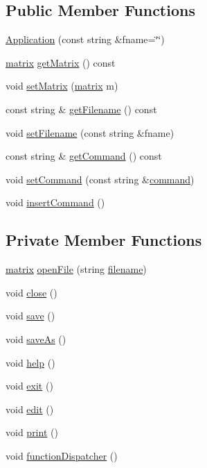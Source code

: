 \subsection*{Public Member Functions}
\begin{DoxyCompactItemize}
\item 
\hyperlink{class_application_ade4650e7378dae1d94794b86995fd571}{Application} (const string \&fname=\char`\"{}\char`\"{})
\item 
\hyperlink{formula_8h_a869e2a5deeb3daa4c82d6bc91cf20d92}{matrix} \hyperlink{class_application_a67aeb617ca44a18045612d92f1d8afa0}{get\+Matrix} () const
\item 
void \hyperlink{class_application_a56b4a55e9eabd40b7f0033ba39631ebe}{set\+Matrix} (\hyperlink{formula_8h_a869e2a5deeb3daa4c82d6bc91cf20d92}{matrix} m)
\item 
const string \& \hyperlink{class_application_a778575fb76de5352152d8928e1c3410f}{get\+Filename} () const
\item 
void \hyperlink{class_application_a76de879568ee39ac80484441716928d2}{set\+Filename} (const string \&fname)
\item 
const string \& \hyperlink{class_application_a74cdbc5e93e1f2c6bb4b45a6ad8b8a62}{get\+Command} () const
\item 
void \hyperlink{class_application_ae652f7ff140c5a74c3806f728e9a18f3}{set\+Command} (const string \&\hyperlink{class_application_acffe56e592fb525ce14ad0437c2c3d34}{command})
\item 
void \hyperlink{class_application_a474d8507e340581404d4044c0228f655}{insert\+Command} ()
\end{DoxyCompactItemize}
\subsection*{Private Member Functions}
\begin{DoxyCompactItemize}
\item 
\hyperlink{formula_8h_a869e2a5deeb3daa4c82d6bc91cf20d92}{matrix} \hyperlink{class_application_ab2f161414a4e2f16e28321c192051006}{open\+File} (string \hyperlink{class_application_a3a20c3178562a91be951369d3356aabd}{filename})
\item 
void \hyperlink{class_application_a5a7dcf61b6701a2b2665c78e4e074e73}{close} ()
\item 
void \hyperlink{class_application_a2cbf94e01d55a814de35f90f4d874647}{save} ()
\item 
void \hyperlink{class_application_a10d5a48c95593cee25c1b9e0e257b5a7}{save\+As} ()
\item 
void \hyperlink{class_application_a2c6518d7f121299d9be8c66d31997fbc}{help} ()
\item 
void \hyperlink{class_application_a3c8a98d6c10a5b054800488df16cdbcb}{exit} ()
\item 
void \hyperlink{class_application_a4b193bf9c8be7105e89a2323ea77b1f4}{edit} ()
\item 
void \hyperlink{class_application_a2bc1937440cb9e71dace95c3fe7ed4ea}{print} ()
\item 
void \hyperlink{class_application_a00241f0a09c32b0ef3cb1f068475cc50}{function\+Dispatcher} ()
\end{DoxyCompactItemize}

